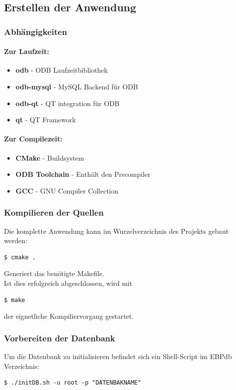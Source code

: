 \newpage

\subsection{Erstellen der Anwendung}
\subsubsection{Abhängigkeiten}
\paragraph{Zur Laufzeit:}
\begin{itemize}
	\item \textbf{odb} - ODB Laufzeitbibliothek
	\item \textbf{odb-mysql} - MySQL Backend für ODB
	\item \textbf{odb-qt} - QT integration für ODB
	\item \textbf{qt} - QT Framework
\end{itemize}
\paragraph{Zur Compilezeit:}
\begin{itemize}
	\item \textbf{CMake} - Buildsystem
	\item \textbf{ODB Toolchain} - Enthält den Precompiler
	\item \textbf{GCC} - GNU Compiler Collection
\end{itemize}
\subsubsection{Kompilieren der Quellen}
Die komplette Anwendung kann im Wurzelverzeichnis des Projekts gebaut werden:\\
\begin{lstlisting}
$ cmake .
\end{lstlisting}
Generiert das benötigte Makefile.\\
Ist dies erfolgreich abgeschlossen, wird mit\\
\begin{lstlisting}
$ make
\end{lstlisting}
der eignetliche Kompiliervorgang gestartet.\\
\subsubsection{Vorbereiten der Datenbank}
Um die Datenbank zu initialisieren befindet sich ein Shell-Script im EBPdb Verzeichnis:\\
\begin{lstlisting}
$ ./initDB.sh -u root -p "DATENBAKNAME"
\end{lstlisting}
